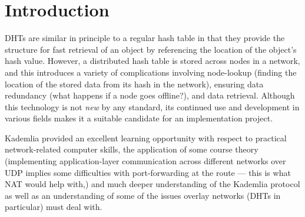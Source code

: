 \documentclass[12pt]{report}
\begin{document}
	
	
	\pagebreak %
	
	\tableofcontents
	
	\pagebreak

    \section{Introduction}
    DHTs are similar in principle to a regular hash table in that they provide
    the structure for fast retrieval of an object by referencing the location
    of the object's hash value.  However, a distributed hash table is stored
    across nodes in a network, and this introduces a variety of complications
    involving node-lookup (finding the location of the stored data from its
    hash in the network), ensuring data redundancy (what happens if a node goes
    offline?), and data retrieval.  Although this technology is not
    \textit{new} by any standard, its continued use and development in various
    fields makes it a suitable candidate for an implementation project.

    Kademlia provided an excellent learning opportunity with respect to
    practical network-related computer skills, the application of some course
    theory (implementing application-layer communication across different
    networks over UDP implies some difficulties with port-forwarding at the
    route --- this is what NAT would help with,) and much deeper understanding
    of the Kademlia protocol as well as an understanding of some of the issues
    overlay networks (DHTs in particular) must deal with.
   
\end{document}
